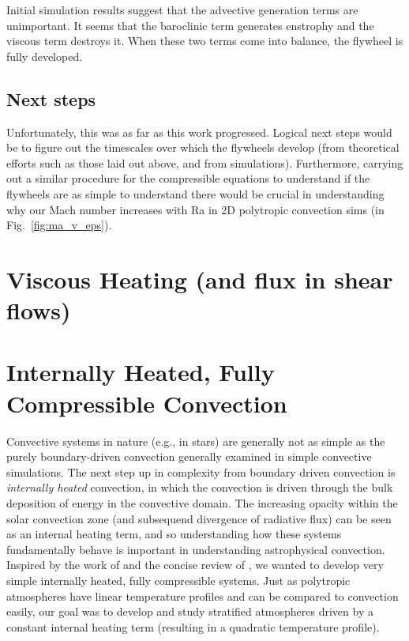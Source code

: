 Initial simulation results suggest that the advective generation terms are unimportant.
It seems that the baroclinic term generates enstrophy and the viscous term destroys it.
When these two terms come into balance, the flywheel is fully developed.

\subsection{Next steps}
Unfortunately, this was as far as this work progressed.
Logical next steps would be to figure out the timescales over which the flywheels develop (from theoretical efforts such as those laid out above, and from simulations).
Furthermore, carrying out a similar procedure for the compressible equations to understand if the flywheels are as simple to understand there would be crucial in understanding why our Mach number increases with Ra in 2D polytropic convection sims (in Fig.~\ref{fig:ma_v_eps}).

\section{Viscous Heating (and flux in shear flows)}

\section{Internally Heated, Fully Compressible Convection}
\label{sec:internally_heated}
Convective systems in nature (e.g., in stars) are generally not as simple as the purely boundary-driven convection generally examined in simple convective simulations.
The next step up in complexity from boundary driven convection is \emph{internally heated} convection, in which the convection is driven through the bulk deposition of energy in the convective domain.
The increasing opacity within the solar convection zone (and subsequend divergence of radiative flux) can be seen as an internal heating term, and so understanding how these systems fundamentally behave is important in understanding astrophysical convection.
Inspired by the work of \citet{goluskin&spiegel2012} and the concise review of \citet{goluskin2015}, we wanted to develop very simple internally heated, fully compressible systems.
Just as polytropic atmospheres have linear temperature profiles and can be compared to \RB convection easily, our goal was to develop and study stratified atmospheres driven by a constant internal heating term (resulting in a quadratic temperature profile).

